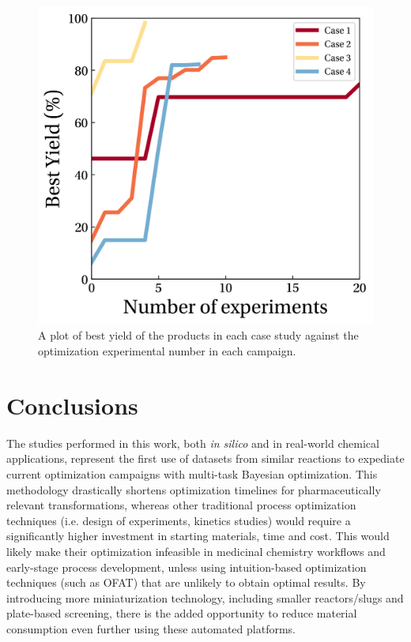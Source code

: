 \begin{figure}
    \centering
    \includegraphics[width=\textwidth]{gfx/Chapter04/ch_activation_optimization_curves.png}
    \caption{A plot of best yield of the products in each case study against the optimization experimental number in each campaign.}
    \label{fig:optimization_curves}
\end{figure}


\section{Conclusions}

The studies performed in this work, both \textit{in silico} and in real-world chemical applications, represent the first use of datasets from similar reactions to expediate current optimization campaigns with multi-task Bayesian optimization. This methodology drastically shortens optimization timelines for pharmaceutically relevant transformations, whereas other traditional process optimization techniques (i.e. design of experiments, kinetics studies) would require a significantly higher investment in starting materials, time and cost. This would likely make their optimization infeasible in medicinal chemistry workflows and early-stage process development, unless using intuition-based optimization techniques (such as OFAT) that are unlikely to obtain optimal results. By introducing more miniaturization technology, including smaller reactors/slugs and plate-based screening, there is the added opportunity to reduce material consumption even further using these automated platforms.

